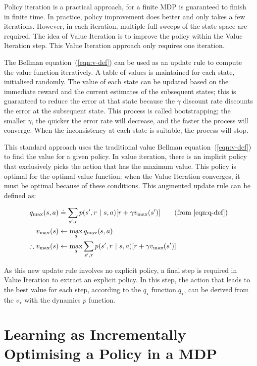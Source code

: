 \documentclass[]{final_report}
\begin{document}
Policy iteration is a practical approach, for a finite MDP is guaranteed to finish in finite time. In practice, policy improvement does better and only takes a few iterations. However, in each iteration, multiple full sweeps of the state space are required. The idea of Value Iteration is to improve the policy within the Value Iteration step. This Value Iteration approach only requires one iteration. 

The Bellman equation~(\ref{eqn:v-def}) can be used as an update rule to compute the value function iteratively. A table of values is maintained for each state, initialised randomly. The value of each state can be updated based on the immediate reward and the current estimates of the subsequent states; this is guaranteed to reduce the error at that state because the $\gamma$ discount rate discounts the error at the subsequent state. This process is called bootstrapping; the smaller $\gamma$, the quicker the error rate will decrease, and the faster the process will converge. When the inconsistency at each state is suitable, the process will stop. 

This standard approach uses the traditional value Bellman equation~(\ref{eqn:v-def}) to find the value for a given policy. In value iteration, there is an implicit policy that exclusively picks the action that has the maximum value. This policy is optimal for the optimal value function; when the Value Iteration converges, it must be optimal because of these conditions. This augmented update rule can be defined as:

\begin{align}
  q_{\text{max}}(s,a)          & \doteq \sum_{s',r}p(s',r\ |\ s, a)[r + \gamma v_{\text{max}}(s')] \tag{from~\ref{eqn:q-def}} \\
  v_{\text{max}}(s)            & \leftarrow  \max_a q_{\text{max}}(s,a) \label{eqn:v-update}                                  \\
  \therefore v_{\text{max}}(s) & \leftarrow  \max_a \sum_{s',r}p(s',r\ |\ s, a)[r + \gamma v_{\text{max}}(s')]
\end{align}


As this new update rule involves no explicit policy, a final step is required in Value Iteration to extract an explicit policy. In this step, the action that leads to the best value for each step, according to the $q_\star$ function.$q_\star$, can be derived from the $v_\star$ with the dynamics $p$ function.


\section{Learning as Incrementally Optimising a Policy in a MDP}
\end{document}

